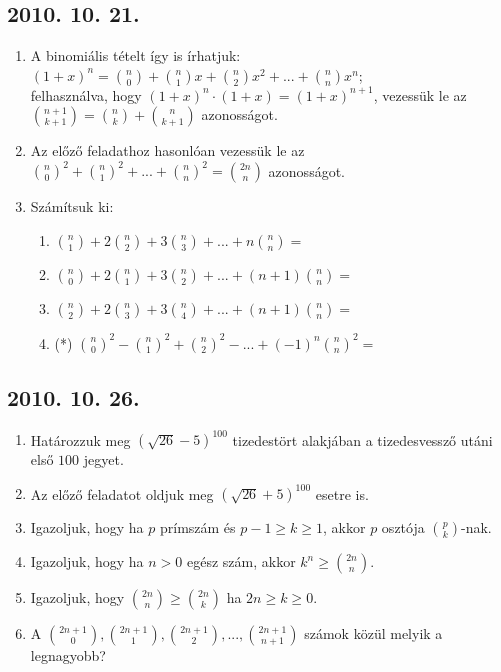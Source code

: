 \documentclass{article}
\newenvironment{abc}{\begin{enumerate}[label=\textit{\alph*})]}{\end{enumerate}}
\begin{document}
\subsection*{2010. 10. 21.}
\begin{enumerate}
\item A binomiális tételt így is írhatjuk:
$(1+x)^{n}=\binom{n}{0}+\binom{n}{1}x+\binom{n}{2}x^{2}+...+\binom{n}{n}x^{n}$; \\ felhasználva, hogy $(1+x)^{n}\cdot(1+x)=(1+x)^{n+1}$, vezessük le az $\binom{n+1}{k+1}=\binom{n}{k}+\binom{n}{k+1}$ azonosságot.
\item Az előző feladathoz hasonlóan vezessük le az $\binom{n}{0}^{2}+\binom{n}{1}^{2}+...+\binom{n}{n}^{2}=\binom{2n}{n}$ azonosságot.
\item Számítsuk ki:
	\begin{abc}
    	\item $\binom{n}{1}+2\binom{n}{2}+3\binom{n}{3}+...+n\binom{n}{n}=$
        \item $\binom{n}{0}+2\binom{n}{1}+3\binom{n}{2}+...+(n+1)\binom{n}{n}=$
        \item $\binom{n}{2}+2\binom{n}{3}+3\binom{n}{4}+...+(n+1)\binom{n}{n}=$
        \item (*) $\binom{n}{0}^{2}-\binom{n}{1}^{2}+\binom{n}{2}^{2}-...+(-1)^{n}\binom{n}{n}^{2}=$
    \end{abc}
\end{enumerate}


\subsection*{2010. 10. 26.}
\begin{enumerate}
\item Határozzuk meg $(\sqrt{26}-5)^{100}$ tizedestört alakjában a tizedesvessző utáni első $100$ jegyet.
\item Az előző feladatot oldjuk meg $(\sqrt{26}+5)^{100}$ esetre is.
\item Igazoljuk, hogy ha $p$ prímszám és $p-1\ge{k}\ge{1}$, akkor $p$ osztója $\binom{p}{k}$-nak.
\item Igazoljuk, hogy ha $n>0$ egész szám, akkor $k^{n}\ge{\binom{2n}{n}}$.
\item Igazoljuk, hogy $\binom{2n}{n}\ge{\binom{2n}{k}}$ ha $2n\ge{k}\ge{0}$.
\item A $\binom{2n+1}{0}, \binom{2n+1}{1}, \binom{2n+1}{2},... ,\binom{2n+1}{n+1}$ számok közül melyik a legnagyobb?
\end{enumerate}
\end{document}
